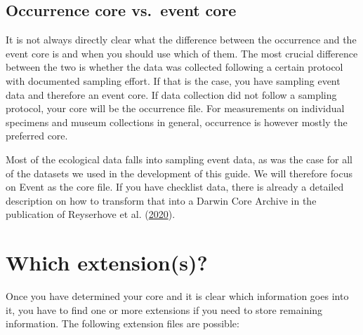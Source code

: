 \documentclass[
]{book}
\begin{document}
\hypertarget{occurrence-core-vs.-event-core}{%
\subsection{Occurrence core vs.~event core}\label{occurrence-core-vs.-event-core}}

It is not always directly clear what the difference between the occurrence and the event core is and when you should use which of them. The most crucial difference between the two is whether the data was collected following a certain protocol with documented sampling effort. If that is the case, you have sampling event data and therefore an event core. If data collection did not follow a sampling protocol, your core will be the occurrence file. For measurements on individual specimens and museum collections in general, occurrence is however mostly the preferred core.

Most of the ecological data falls into sampling event data, as was the case for all of the datasets we used in the development of this guide. We will therefore focus on Event as the core file. If you have checklist data, there is already a detailed description on how to transform that into a Darwin Core Archive in the publication of Reyserhove et al. (\protect\hyperlink{ref-Reyershove}{2020}).

\hypertarget{which-extensions}{%
\section{Which extension(s)?}\label{which-extensions}}

Once you have determined your core and it is clear which information goes into it, you have to find one or more extensions if you need to store remaining information. The following extension files are possible:
\end{document}
